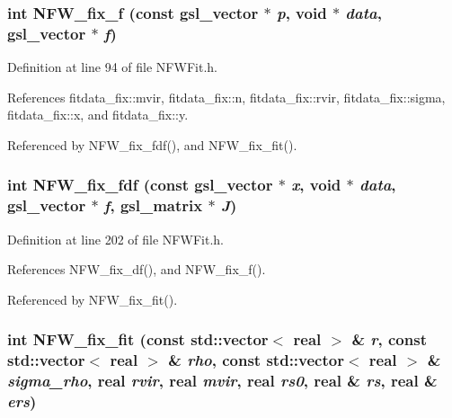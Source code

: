 \subsubsection[{NFW\_\-fix\_\-f}]{\setlength{\rightskip}{0pt plus 5cm}int NFW\_\-fix\_\-f (const gsl\_\-vector $\ast$ {\em p}, \/  void $\ast$ {\em data}, \/  gsl\_\-vector $\ast$ {\em f})}\label{NFWFit_8h_ae5a00852fa31030c15f761db6c0fffaf}


Definition at line 94 of file NFWFit.h.



References fitdata\_\-fix::mvir, fitdata\_\-fix::n, fitdata\_\-fix::rvir, fitdata\_\-fix::sigma, fitdata\_\-fix::x, and fitdata\_\-fix::y.



Referenced by NFW\_\-fix\_\-fdf(), and NFW\_\-fix\_\-fit().

\subsubsection[{NFW\_\-fix\_\-fdf}]{\setlength{\rightskip}{0pt plus 5cm}int NFW\_\-fix\_\-fdf (const gsl\_\-vector $\ast$ {\em x}, \/  void $\ast$ {\em data}, \/  gsl\_\-vector $\ast$ {\em f}, \/  gsl\_\-matrix $\ast$ {\em J})}\label{NFWFit_8h_a32530cff0769cee40ebf88d4b49722db}


Definition at line 202 of file NFWFit.h.



References NFW\_\-fix\_\-df(), and NFW\_\-fix\_\-f().



Referenced by NFW\_\-fix\_\-fit().

\subsubsection[{NFW\_\-fix\_\-fit}]{\setlength{\rightskip}{0pt plus 5cm}int NFW\_\-fix\_\-fit (const std::vector$<$ {\bf real} $>$ \& {\em r}, \/  const std::vector$<$ {\bf real} $>$ \& {\em rho}, \/  const std::vector$<$ {\bf real} $>$ \& {\em sigma\_\-rho}, \/  {\bf real} {\em rvir}, \/  {\bf real} {\em mvir}, \/  {\bf real} {\em rs0}, \/  {\bf real} \& {\em rs}, \/  {\bf real} \& {\em ers})}\label{NFWFit_8h_aa91c4fd9ac027504e75d7f3c44dced86}


